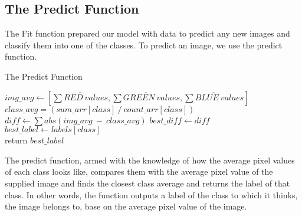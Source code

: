 \documentclass{article}
\begin{document}
\subsection{The Predict Function}
The Fit function prepared our model with data to predict any new images and classify them into one of the classes. To predict an image, we use the predict function.\par
\begin{algorithm}
\caption{The Predict Function}
\begin{algorithmic}[1]
\State $img\_avg \gets [\overline{\sum RED\ values},\overline{\sum GREEN\ values},\overline{\sum BLUE\ values}]$ 
\State $class\_avg = (sum\_arr[class]\ /\ count\_arr[class])$
\State $diff \gets \sum abs(img\_avg\ -\ class\_avg)$
\State $best\_diff \gets diff$
\State $best\_label \gets labels[class]$
\EndIf
\EndFor\\
return $best\_label$
\EndProcedure
\end{algorithmic}
\end{algorithm}
The predict function, armed with the knowledge of how the average pixel values of each class looks like, compares them with the average pixel value of the supplied image and finds the closest class average and returns the label of that class. In other words, the function outputs a label of the class to which it thinks, the image belongs to, base on the average pixel value of the image.
\end{document}
